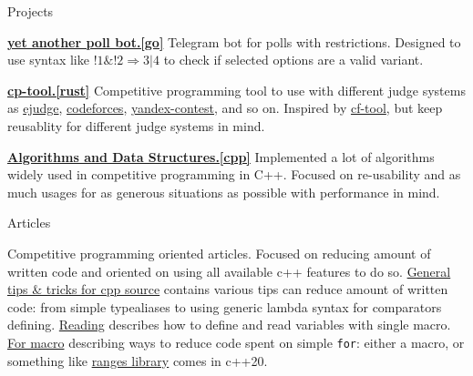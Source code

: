 \documentclass{resume} %
\begin{document}
\begin{rSection}{Projects}
\vspace{-1.25em}
\item \href{https://github.com/dendi239/yet-another-poll-bot}{\textbf{yet another poll bot.[go]}} {
    Telegram bot for polls with restrictions.
    Designed to use syntax like $!1 \& !2 \Rightarrow 3 | 4$ to check if selected options are a valid variant.
}
\item \href{https://github.com/dendi239/cp-tool}{\textbf{cp-tool.[rust]}} {
    Competitive programming tool to use with different judge systems as \href{https://ejudge.ru}{ejudge}, \href{https://codeforces.com}{codeforces}, \href{https://contest.yandex.ru}{yandex-contest}, and so on.
    Inspired by \href{https://github.com/xalanq/cf-tool}{cf-tool}, but keep reusablity for different judge systems in mind.
}
\item \href{https://github.com/dendi239/algorithms-data-structures}{\textbf{Algorithms and Data Structures.[cpp]}} {
    Implemented a lot of algorithms widely used in competitive programming in C++. Focused on re-usability and as much usages for as generous situations as possible with performance in mind.
}
\end{rSection}

\begin{rSection}{Articles}

Competitive programming oriented articles. Focused on reducing amount of written code and oriented on using all available c++ features to do so.
\href{https://codeforces.com/blog/entry/79446}{General tips \& tricks for cpp source} contains various tips can reduce amount of written code: from simple typealiases to using generic lambda syntax for comparators defining.
\href{https://codeforces.com/blog/entry/79066}{Reading} describes how to define and read variables with single macro.
\href{https://codeforces.com/blog/entry/79100}{For macro} describing ways to reduce code spent on simple \texttt{for}: either a macro, or something like \href{https://en.cppreference.com/w/cpp/ranges}{ranges library} comes in c++20.

\end{rSection}



\end{document}
